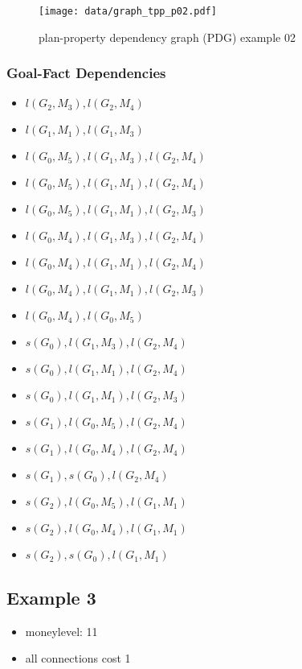 \begin{figure}[ht]
\begin{center}
	\texttt{[image: data/graph\_tpp\_p02.pdf]}
\end{center}
\caption{plan-property dependency graph (PDG) example 02}
\end{figure}

\subsubsection*{Goal-Fact Dependencies}
\begin{itemize}
	\item $l(G_2,M_3),l(G_2,M_4)$
	\item $l(G_1,M_1),l(G_1,M_3)$
	\item $l(G_0,M_5),l(G_1,M_3),l(G_2,M_4)$
	\item $l(G_0,M_5),l(G_1,M_1),l(G_2,M_4)$
	\item $l(G_0,M_5),l(G_1,M_1),l(G_2,M_3)$
	\item $l(G_0,M_4),l(G_1,M_3),l(G_2,M_4)$
	\item $l(G_0,M_4),l(G_1,M_1),l(G_2,M_4)$
	\item $l(G_0,M_4),l(G_1,M_1),l(G_2,M_3)$
	\item $l(G_0,M_4),l(G_0,M_5)$
	\item $s(G_0),l(G_1,M_3),l(G_2,M_4)$
	\item $s(G_0),l(G_1,M_1),l(G_2,M_4)$
	\item $s(G_0),l(G_1,M_1),l(G_2,M_3)$
	\item $s(G_1),l(G_0,M_5),l(G_2,M_4)$
	\item $s(G_1),l(G_0,M_4),l(G_2,M_4)$
	\item $s(G_1),s(G_0),l(G_2,M_4)$
	\item $s(G_2),l(G_0,M_5),l(G_1,M_1)$
	\item $s(G_2),l(G_0,M_4),l(G_1,M_1)$
	\item $s(G_2),s(G_0),l(G_1,M_1)$
\end{itemize}


\subsection*{Example 3}

\begin{itemize}
	\item moneylevel: 11
	\item all connections cost 1
\end{itemize}

